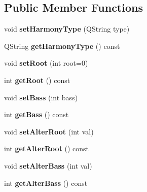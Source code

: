 \subsection*{Public Member Functions}
\begin{DoxyCompactItemize}
\item 
\mbox{\label{class_o_v_e_1_1_harmony_aaf0e82e1aff30d05a54abe67225d2c37}} 
void {\bfseries set\+Harmony\+Type} (Q\+String type)
\item 
\mbox{\label{class_o_v_e_1_1_harmony_abf90fa0bf57dc301561f7382a4033446}} 
Q\+String {\bfseries get\+Harmony\+Type} () const
\item 
\mbox{\label{class_o_v_e_1_1_harmony_a8584adc5ad21ff69fb3077bb3d7f51c9}} 
void {\bfseries set\+Root} (int root=0)
\item 
\mbox{\label{class_o_v_e_1_1_harmony_a21ca322446418f83ac08648c96f365fe}} 
int {\bfseries get\+Root} () const
\item 
\mbox{\label{class_o_v_e_1_1_harmony_aee73cad34cf52bd59d88842be94a089f}} 
void {\bfseries set\+Bass} (int bass)
\item 
\mbox{\label{class_o_v_e_1_1_harmony_a2b0b3508440c007ae6792b9e72b72f56}} 
int {\bfseries get\+Bass} () const
\item 
\mbox{\label{class_o_v_e_1_1_harmony_aed9012e3cc4ea652eec658a4d4a4238e}} 
void {\bfseries set\+Alter\+Root} (int val)
\item 
\mbox{\label{class_o_v_e_1_1_harmony_a1377f1e9d402abec75c4c4127aede301}} 
int {\bfseries get\+Alter\+Root} () const
\item 
\mbox{\label{class_o_v_e_1_1_harmony_afe30c7a24d385e3d5a04dd3dc8b3918d}} 
void {\bfseries set\+Alter\+Bass} (int val)
\item 
\mbox{\label{class_o_v_e_1_1_harmony_a306fec4bf7e3ebfc1c12355cc2fae743}} 
int {\bfseries get\+Alter\+Bass} () const

\end{DoxyCompactItemize}
